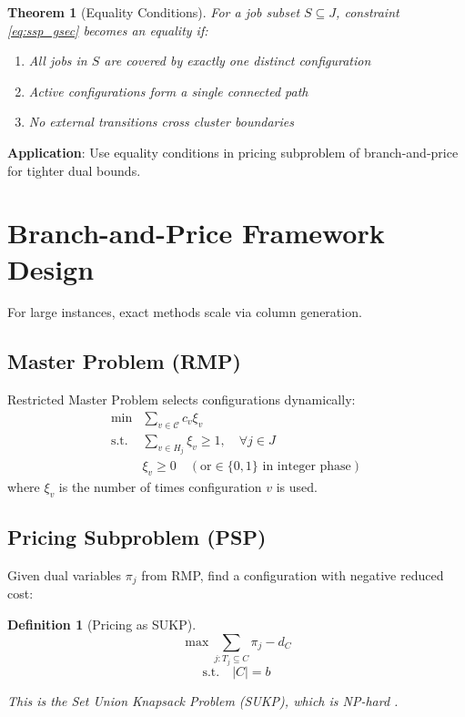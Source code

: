 \documentclass[12pt]{article}
\newtheorem{theorem}{Theorem}[section]
\newtheorem{definition}{Definition}[section]
\begin{document}
	\begin{theorem}[Equality Conditions]
		For a job subset $S \subseteq J$, constraint \eqref{eq:ssp_gsec} becomes an equality if:
		\begin{enumerate}
			\item All jobs in $S$ are covered by exactly one distinct configuration
			\item Active configurations form a single connected path
			\item No external transitions cross cluster boundaries
		\end{enumerate}
	\end{theorem}
	
	\textbf{Application}: Use equality conditions in pricing subproblem of branch-and-price for tighter dual bounds.
	
	\section{Branch-and-Price Framework Design}
	
	For large instances, exact methods scale via column generation.
	
	\subsection{Master Problem (RMP)}
	
	Restricted Master Problem selects configurations dynamically:
	\begin{align}
		\min & \sum_{v \in \mathcal{C}} c_v \xi_v \\
		\text{s.t.} & \sum_{v \in H_j} \xi_v \ge 1, \quad \forall j \in J \\
		& \xi_v \ge 0 \quad (\text{or} \in \{0,1\} \text{ in integer phase})
	\end{align}
	where $\xi_v$ is the number of times configuration $v$ is used.
	
	\subsection{Pricing Subproblem (PSP)}
	
	Given dual variables $\pi_j$ from RMP, find a configuration with negative reduced cost:
	
	\begin{definition}[Pricing as SUKP]
		\label{def:sukp_pricing}
		$$\max \sum_{j: T_j \subseteq C} \pi_j - d_C$$
		$$\text{s.t.} \quad |C| = b$$
		
		This is the Set Union Knapsack Problem (SUKP), which is NP-hard \citep{Goldschmidt1994}.
	\end{definition}
	
\end{document}

